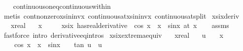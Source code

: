 \begin{isabellebody}
%
\isadelimproof
\ \ %
\endisadelimproof
%
\isatagproof
{}\isamarkupfalse%
\ continuous{\isacharunderscore}{\kern0pt}on{\isacharunderscore}{\kern0pt}eq{\isacharunderscore}{\kern0pt}continuous{\isacharunderscore}{\kern0pt}within\isanewline
\ \ \isamarkupfalse%
\ {\isacharparenleft}{\kern0pt}metis\ cont{\isacharunderscore}{\kern0pt}nonzero{\isacharunderscore}{\kern0pt}xsininvx\ continuous{\isacharunderscore}{\kern0pt}at{\isacharunderscore}{\kern0pt}{}{\isacharunderscore}{\kern0pt}xsininvx\ continuous{\isacharunderscore}{\kern0pt}at{\isacharunderscore}{\kern0pt}split{\isacharparenright}{\kern0pt}%
\endisatagproof
{\isafoldproof}%
%
\isadelimproof
\isanewline
%
\endisadelimproof
\isanewline
\isanewline
\isanewline
{}\isamarkupfalse%
\ xsix{\isacharunderscore}{\kern0pt}deriv{\isacharcolon}{\kern0pt}\isanewline
\ \ \ x{\isacharcolon}{\kern0pt}{\isacharcolon}{\kern0pt}real\isanewline
\ \ \ {\isachardoublequoteopen}x\ {\isasymnoteq}\ {}{\isachardoublequoteclose}\isanewline
\ \ \ {\isachardoublequoteopen}{\isacharparenleft}{\kern0pt}xsix\ has{\isacharunderscore}{\kern0pt}real{\isacharunderscore}{\kern0pt}derivative\ {\isacharparenleft}{\kern0pt}{\isacharminus}{\kern0pt}\ cos\ {\isacharparenleft}{\kern0pt}{}{\isacharslash}{\kern0pt}x{\isacharparenright}{\kern0pt}\ {\isacharslash}{\kern0pt}\ x\ {\isacharplus}{\kern0pt}\ sin{\isacharparenleft}{\kern0pt}{}{\isacharslash}{\kern0pt}x{\isacharparenright}{\kern0pt}{\isacharparenright}{\kern0pt}{\isacharparenright}{\kern0pt}\ {\isacharparenleft}{\kern0pt}at\ x{\isacharparenright}{\kern0pt}{\isachardoublequoteclose}\isanewline
%
\isadelimproof
\ \ %
\endisadelimproof
%
\isatagproof
{}\isamarkupfalse%
\ assms\ \isamarkupfalse%
\ {\isacharparenleft}{\kern0pt}fastforce\ intro{\isacharcolon}{\kern0pt}\ derivative{\isacharunderscore}{\kern0pt}eq{\isacharunderscore}{\kern0pt}intros{\isacharparenright}{\kern0pt}%
\endisatagproof
{\isafoldproof}%
%
\isadelimproof
\isanewline
%
\endisadelimproof
\isanewline
\isanewline
{}\isamarkupfalse%
\ xsix{\isacharunderscore}{\kern0pt}extrema{\isacharunderscore}{\kern0pt}equiv{\isacharcolon}{\kern0pt}\isanewline
\ \ \ x{\isacharcolon}{\kern0pt}{\isacharcolon}{\kern0pt}real\isanewline
\ \ \ {\isachardoublequoteopen}u\ {\isasymequiv}\ {}\ {\isacharslash}{\kern0pt}\ x{\isachardoublequoteclose}\isanewline
\ \ \ {\isachardoublequoteopen}{\isacharparenleft}{\kern0pt}{\isacharminus}{\kern0pt}\ cos\ {\isacharparenleft}{\kern0pt}{}{\isacharslash}{\kern0pt}x{\isacharparenright}{\kern0pt}\ {\isacharslash}{\kern0pt}\ x\ {\isacharplus}{\kern0pt}\ sin{\isacharparenleft}{\kern0pt}{}{\isacharslash}{\kern0pt}x{\isacharparenright}{\kern0pt}{\isacharparenright}{\kern0pt}\ {\isacharequal}{\kern0pt}\ {}\ {\isasymlongleftrightarrow}\ tan\ u\ {\isacharequal}{\kern0pt}\ u{\isachardoublequoteclose}\isanewline

\end{isabellebody}
